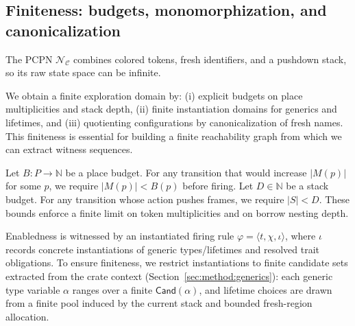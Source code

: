 \documentclass[sigconf]{acmart}
\begin{document}
\subsection{Finiteness: budgets, monomorphization, and canonicalization}
\label{sec:analysis:finiteness}
The PCPN $\mathcal{N}_{\mathcal{C}}$ combines colored tokens, fresh identifiers, and a pushdown stack, so its raw state space can be infinite. 

We obtain a finite exploration domain by:
(i) explicit budgets on place multiplicities and stack depth,
(ii) finite instantiation domains for generics and lifetimes,
and (iii) quotienting configurations by canonicalization of fresh names.
This finiteness is essential for building a finite reachability graph from which we can extract witness sequences.

Let $B:P\to\mathbb{N}$ be a place budget. For any transition that would increase $|M(p)|$ for some $p$, we require $|M(p)|<B(p)$ before firing. Let $D\in\mathbb{N}$ be a stack budget.
For any transition whose action pushes frames, we require $|S|<D$. These bounds enforce a finite limit on token multiplicities and on borrow nesting depth.

Enabledness is witnessed by an instantiated firing rule $\varphi=\langle t,\chi,\iota\rangle$, where $\iota$ records concrete instantiations of generic types/lifetimes and resolved trait obligations. To ensure finiteness, we restrict instantiations to finite candidate sets extracted from the crate context (Section~\ref{sec:method:generics}): each generic type variable $\alpha$ ranges over a finite $\mathsf{Cand}(\alpha)$,
and lifetime choices are drawn from a finite pool induced by the current stack and bounded fresh-region allocation.
\end{document}
